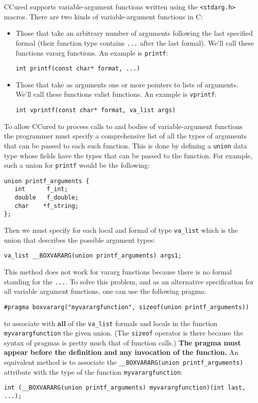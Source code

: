 \documentclass{book}
\def\t#1{{\tt #1}}
\begin{document}
 CCured supports variable-argument functions written using the \t{<stdarg.h>}
 macros. There are two kinds of variable-argument functions in C: 
\begin{itemize}
\item Those that take an arbitrary number of arguments following the last
specified formal (their function type contains \t{...} after the last formal).
We'll call these functions vararg functions. An example is \t{printf}:
\begin{verbatim}
int printf(const char* format, ...)
\end{verbatim}

\item Those that take as arguments one or more pointers to lists of
arguments. We'll call these functions valist functions. An example is
\t{vprintf}:
\begin{verbatim}
int vprintf(const char* format, va_list args)
\end{verbatim}
\end{itemize}

 To allow CCured to process calls to and bodies of variable-argument functions
the programmer must specify a comprehensive list of all the types of arguments
that can be passed to each such function. This is done by defining a \t{union}
data type whose fields have the types that can be passed to the function. For
example, such a union for \t{printf} would be the following:
\begin{verbatim}
union printf_arguments {
   int      f_int;
   double   f_double;
   char    *f_string;
};
\end{verbatim}

 Then we must specify for each local and formal of type \t{va\_list} which is
the union that describes the possible argument types: 
\begin{verbatim}
va_list __BOXVARARG(union printf_arguments) args1;
\end{verbatim}

 This method does not work for vararg functions because there is no formal
standing for the \t{...}. To solve this problem, and as an alternative
specification for all variable argument functions, one can use the following
pragma:
\begin{verbatim}
#pragma boxvararg("myvarargfunction", sizeof(union printf_arguments))
\end{verbatim}

 to associate with {\bf all} of the \t{va\_list} formals and locals in the
function \t{myvarargfunction} the given union. (The \t{sizeof} operator is
there because the syntax of pragmas is pretty much that of function calls.)
{\bf The pragma must appear before the definition and any invocation of the
function.} An equivalent method is to associate the \t{\_\_BOXVARARG(union
printf\_arguments)} attribute with the type of the function
\t{myvarargfunction}:
\begin{verbatim}
int (__BOXVARARG(union printf_arguments) myvarargfunction)(int last, ...);
\end{verbatim}
\end{document}
